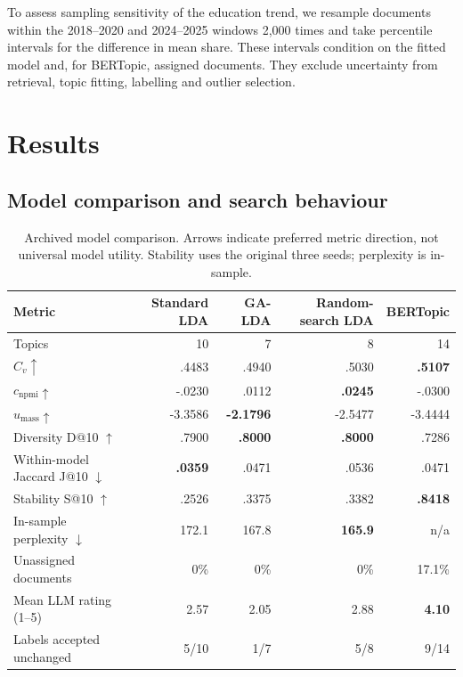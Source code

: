 To assess sampling sensitivity of the education trend, we resample documents within the
2018--2020 and 2024--2025 windows 2,000 times and take percentile intervals for the difference
in mean share. These intervals condition on the fitted model and, for BERTopic, assigned
documents. They exclude uncertainty from retrieval, topic fitting, labelling and outlier selection.

\section{Results}
\label{sec:results}

\subsection{Model comparison and search behaviour}
\begin{table}[t]
\caption{Archived model comparison. Arrows indicate preferred metric direction, not universal
model utility. Stability uses the original three seeds; perplexity is in-sample.}
\label{tab:comparison}\centering\small
\begin{tabular}{@{}lrrrr@{}}\toprule
Metric & Standard LDA & GA-LDA & Random-search LDA & BERTopic\\\midrule
Topics & 10 & 7 & 8 & 14\\
$C_v\uparrow$ & .4483 & .4940 & .5030 & \textbf{.5107}\\
$c_{\mathrm{npmi}}\uparrow$ & -.0230 & .0112 & \textbf{.0245} & -.0300\\
$u_{\mathrm{mass}}\uparrow$ & -3.3586 & \textbf{-2.1796} & -2.5477 & -3.4444\\
Diversity D@10 $\uparrow$ & .7900 & \textbf{.8000} & \textbf{.8000} & .7286\\
Within-model Jaccard J@10 $\downarrow$ & \textbf{.0359} & .0471 & .0536 & .0471\\
Stability S@10 $\uparrow$ & .2526 & .3375 & .3382 & \textbf{.8418}\\
In-sample perplexity $\downarrow$ & 172.1 & 167.8 & \textbf{165.9} & n/a\\
Unassigned documents & 0\% & 0\% & 0\% & 17.1\%\\
Mean LLM rating (1--5) & 2.57 & 2.05 & 2.88 & \textbf{4.10}\\
Labels accepted unchanged & 5/10 & 1/7 & 5/8 & 9/14\\\bottomrule
\end{tabular}\end{table}

